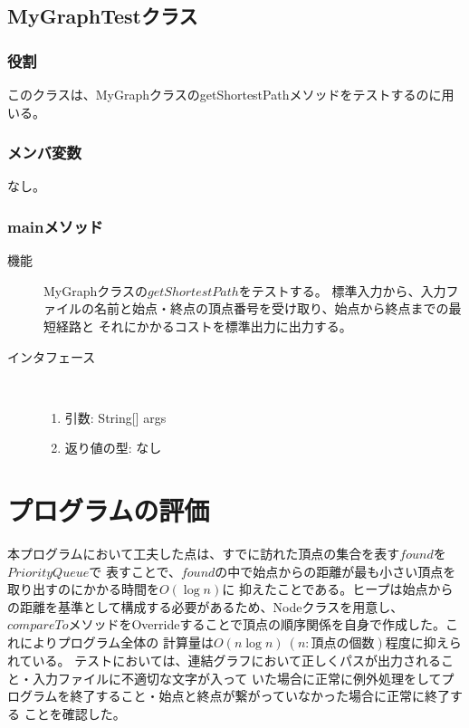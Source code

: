 \documentclass[a4j]{jarticle}
\begin{document}
\subsection{MyGraphTestクラス}

\subsubsection{役割}
このクラスは、MyGraphクラスのgetShortestPathメソッドをテストするのに用いる。

\subsubsection{メンバ変数}
なし。

\subsubsection{mainメソッド}

\begin{description}
\item[機能]
MyGraphクラスの\(getShortestPath\)をテストする。
標準入力から、入力ファイルの名前と始点・終点の頂点番号を受け取り、始点から終点までの最短経路と
それにかかるコストを標準出力に出力する。


\item[インタフェース]\ \vspace{0mm}
\begin{enumerate}
  \item 引数: String[] args
  \item 返り値の型: なし
\end{enumerate}
\end{description}


\section{プログラムの評価}


本プログラムにおいて工夫した点は、すでに訪れた頂点の集合を表す\(found\)を\(PriorityQueue\)で
表すことで、\(found\)の中で始点からの距離が最も小さい頂点を取り出すのにかかる時間を\(O(\log n)\)に
抑えたことである。ヒープは始点からの距離を基準として構成する必要があるため、Nodeクラスを用意し、
\(compareTo\)メソッドをOverrideすることで頂点の順序関係を自身で作成した。これによりプログラム全体の
計算量は\(O(n\log n)\ (n: 頂点の個数)\)程度に抑えられている。
テストにおいては、連結グラフにおいて正しくパスが出力されること・入力ファイルに不適切な文字が入って
いた場合に正常に例外処理をしてプログラムを終了すること・始点と終点が繋がっていなかった場合に正常に終了する
ことを確認した。
\end{document}

